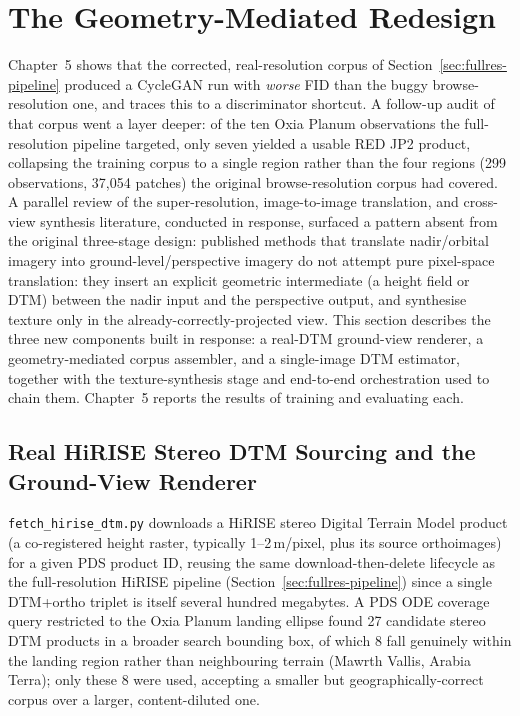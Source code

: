 \section{The Geometry-Mediated Redesign}
\label{sec:geometry-impl}

Chapter~5 shows that the corrected, real-resolution corpus of Section~\ref{sec:fullres-pipeline} produced a CycleGAN run with \emph{worse} FID than the buggy browse-resolution one, and traces this to a discriminator shortcut. A follow-up audit of that corpus went a layer deeper: of the ten Oxia Planum observations the full-resolution pipeline targeted, only seven yielded a usable RED JP2 product, collapsing the training corpus to a single region rather than the four regions (299 observations, 37{,}054 patches) the original browse-resolution corpus had covered. A parallel review of the super-resolution, image-to-image translation, and cross-view synthesis literature, conducted in response, surfaced a pattern absent from the original three-stage design: published methods that translate nadir/orbital imagery into ground-level/perspective imagery do not attempt pure pixel-space translation: they insert an explicit geometric intermediate (a height field or DTM) between the nadir input and the perspective output, and synthesise texture only in the already-correctly-projected view. This section describes the three new components built in response: a real-DTM ground-view renderer, a geometry-mediated corpus assembler, and a single-image DTM estimator, together with the texture-synthesis stage and end-to-end orchestration used to chain them. Chapter~5 reports the results of training and evaluating each.

\subsection{Real HiRISE Stereo DTM Sourcing and the Ground-View Renderer}
\label{sec:renderer-impl}

\texttt{fetch\_hirise\_dtm.py} downloads a HiRISE stereo Digital Terrain Model product (a co-registered height raster, typically 1--2\,m/pixel, plus its source orthoimages) for a given PDS product ID, reusing the same download-then-delete lifecycle as the full-resolution HiRISE pipeline (Section~\ref{sec:fullres-pipeline}) since a single DTM+ortho triplet is itself several hundred megabytes. A PDS ODE coverage query restricted to the Oxia Planum landing ellipse found 27 candidate stereo DTM products in a broader search bounding box, of which 8 fall genuinely within the landing region rather than neighbouring terrain (Mawrth Vallis, Arabia Terra); only these 8 were used, accepting a smaller but geographically-correct corpus over a larger, content-diluted one.

